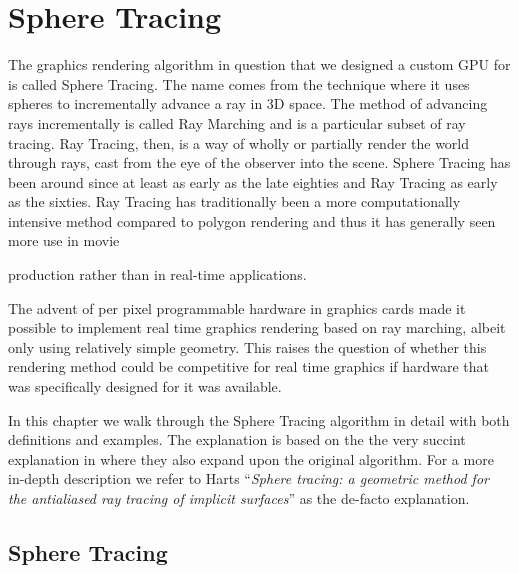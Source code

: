 \chapter{Sphere Tracing}


	The graphics rendering algorithm in question that we designed a custom GPU
	for is called Sphere Tracing\cite{Hart1996}. The name comes from the
	technique where it uses spheres to incrementally advance a ray in 3D space.
	The method of advancing rays incrementally is called Ray Marching and is a
	particular subset of ray tracing\cite{Whitted1980}. Ray Tracing, then, is a
	way of wholly or partially render the world through rays, cast from the eye
	of the observer into the scene. Sphere Tracing has been around since at least as early as the late eighties\cite{Hart1989} and Ray Tracing as early as the
	sixties\cite{Appel1968}. Ray Tracing has traditionally been a more
	computationally intensive method compared to polygon
	rendering\cite{Wylie1967} and thus it has generally seen more use in movie

	production rather than in real-time applications.\cite{ref_needed?} 

	The advent of per pixel programmable hardware in graphics cards made it 
	possible to implement real time graphics rendering based on ray	marching, 
	albeit only using relatively simple geometry. This raises the question of 
	whether this rendering method could be competitive for real time graphics 
	if hardware that was specifically designed for it was available.

	In this chapter we walk through the Sphere Tracing algorithm in detail with
	both definitions and examples. The explanation is based on the the very
	succint explanation in \cite{Korndorfer2014} where they also expand upon the
	original algorithm. For a more in-depth description we refer to Harts
	“\emph{Sphere tracing: a geometric method for the antialiased ray tracing
	of implicit surfaces}”\cite{Hart1996} as the de-facto explanation.


	\section{Sphere Tracing} 

